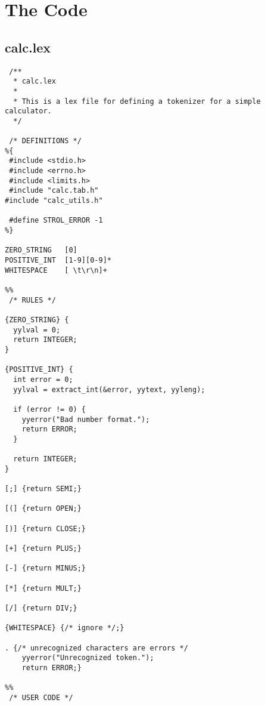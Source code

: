 \documentclass{article}
\begin{document}
\section{The Code}
\subsection{calc.lex}
\begin{verbatim}
 /**
  * calc.lex
  *
  * This is a lex file for defining a tokenizer for a simple calculator.
  */

 /* DEFINITIONS */
%{
 #include <stdio.h>
 #include <errno.h>
 #include <limits.h>
 #include "calc.tab.h"
#include "calc_utils.h"

 #define STROL_ERROR -1
%}

ZERO_STRING   [0]
POSITIVE_INT  [1-9][0-9]*
WHITESPACE    [ \t\r\n]+

%%
 /* RULES */

{ZERO_STRING} {
  yylval = 0;
  return INTEGER;
}

{POSITIVE_INT} {
  int error = 0;
  yylval = extract_int(&error, yytext, yyleng);

  if (error != 0) {
    yyerror("Bad number format.");
    return ERROR;
  }

  return INTEGER;
}

[;] {return SEMI;}

[(] {return OPEN;}

[)] {return CLOSE;}

[+] {return PLUS;}

[-] {return MINUS;}

[*] {return MULT;}

[/] {return DIV;}

{WHITESPACE} {/* ignore */;}

. {/* unrecognized characters are errors */
	yyerror("Unrecognized token.");
    return ERROR;}

%%
 /* USER CODE */
\end{verbatim}
\end{document}
